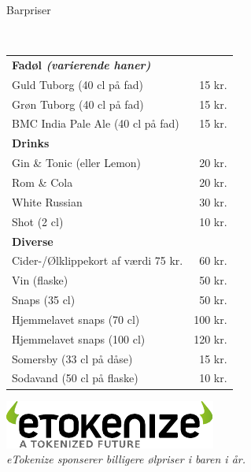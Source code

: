 \begin{flushleft}
\begin{huge}
Barpriser
\end{huge}
\\[.1cm]
\begin{table}[h!]
\begin{tabular}{lr}
\textbf{Fadøl \emph{(varierende haner)}} & \\
Guld Tuborg (40 cl på fad) & 15 kr.\\
Grøn Tuborg (40 cl på fad) & 15 kr.\\
BMC India Pale Ale (40 cl på fad) & 15 kr.\\[2ex]
\textbf{Drinks} & \\
Gin \& Tonic (eller Lemon) & 20 kr.\\
Rom \& Cola & 20 kr.\\
White Russian & 30 kr.\\
Shot (2 cl) & 10 kr.\\[2ex]
\textbf{Diverse} & \\
Cider-/Ølklippekort af værdi 75 kr. & 60 kr.\\
Vin (flaske) & 50 kr.\\
Snaps (35 cl) & 50 kr.\\
Hjemmelavet snaps (70 cl) & 100 kr.\\
Hjemmelavet snaps (100 cl) & 120 kr.\\
Somersby (33 cl på dåse) & 15 kr. \\
Sodavand (50 cl på flaske) & 10 kr.\\
\end{tabular}
\end{table}
\end{flushleft}
\vfill
\begin{center}
\includegraphics[width=.9\linewidth]{etokenize.pdf}
\\[2mm]\emph{eTokenize sponserer billigere ølpriser i baren i år.}
\end{center}
